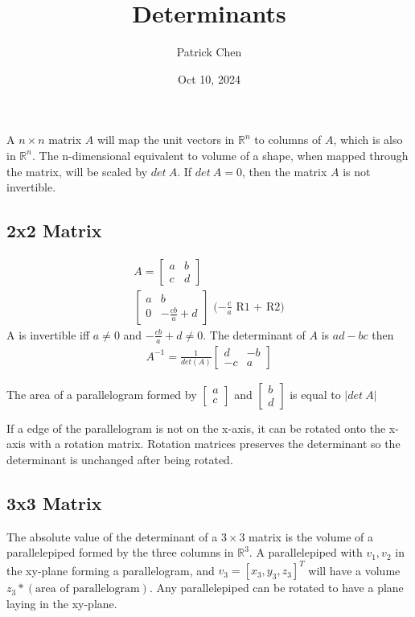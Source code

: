 \documentclass{article}
\title{Determinants}
\author{Patrick Chen}
\date{Oct 10, 2024}
\theoremstyle{mytheoremstyle}
\theoremstyle{mytheoremstyle}
\theoremstyle{myproblemstyle}
\begin{document}
    \maketitle
    A $n\times n$ matrix $A$ will map the unit vectors in $\mathbb{R}^n$ to
    columns of $A$, which is also in $\mathbb{R}^n$. The n-dimensional
    equivalent to volume of a shape, when mapped through the matrix, will be
    scaled by $det\ A$. If $det\ A = 0$, then the matrix $A$ is not invertible.

    \subsection*{2x2 Matrix}
    \begin{align*}
        A = \begin{bmatrix}
            a & b \\
            c & d
        \end{bmatrix} \\
        \begin{bmatrix}
            a & b \\
            0 & -\frac{cb}{a} + d
        \end{bmatrix} \text{ ($-\frac{c}{a}$ R1 + R2)}
    \end{align*}
    A is invertible iff $a\ne 0$ and $-\frac{cb}{a} +d\ne 0$.
    The determinant of $A$ is $ad-bc$ then
    \begin{align*}
        A^{-1} = \frac{1}{det(A)} \begin{bmatrix}
            d & -b \\
            -c & a
        \end{bmatrix}
    \end{align*}

    The area of a parallelogram formed by $\begin{bmatrix} a \\ c \end{bmatrix}$
    and $\begin{bmatrix} b \\ d \end{bmatrix}$ is equal to $|det\ A|$

    If a edge of the parallelogram is not on the x-axis, it can be rotated onto
    the x-axis with a rotation matrix. Rotation matrices preserves the
    determinant so the determinant is unchanged after being rotated.

    \subsection*{3x3 Matrix}
    The absolute value of the determinant of a $3\times 3$ matrix is the volume
    of a parallelepiped formed by the three columns in $\mathbb{R}^3$. A
    parallelepiped with $v_1,v_2$ in the xy-plane forming a parallelogram, and
    $v_3=[x_3,y_3,z_3]^T$ will have a volume $z_3*(\text{area of
    parallelogram})$. Any parallelepiped can be rotated to have a plane laying
    in the xy-plane.
\end{document}
